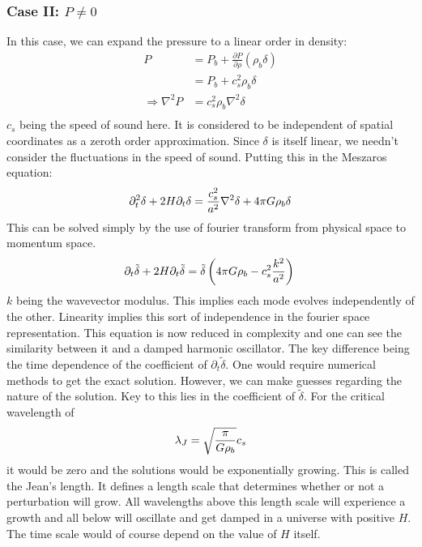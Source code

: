 \documentclass[12pt,a4paper,twoside]{book}
\def\pa{{\partial}}
\begin{document}
			\subsubsection{Case II: $P\neq0$}
				In this case, we can expand the pressure to a linear order in density:
				$$
				\begin{aligned}
					P&=P_b+\frac{\pa P}{\pa \rho}(\rho_b\delta)\\
					&=P_b+c_s^2\rho_b\delta\\
					\Rightarrow\nabla^2P&=c_s^2\rho_b\nabla^2\delta\\
				\end{aligned}
				$$
				$c_s$ being the speed of sound here. It is considered to be independent of spatial coordinates as a zeroth order approximation. Since $\delta$ is itself linear, we needn't consider the fluctuations in the speed of sound. Putting this in the Meszaros equation:
				$$
					\pa_t^2\delta+2H\pa_t\delta=\frac{c_s^2}{a^2}\nabla^2\delta+4\pi G\rho_b\delta\\
				$$
				This can be solved simply by the use of fourier transform from physical space to momentum space.
				$$
					\pa_t\tilde{\delta}+2H\pa_t\tilde{\delta}=\tilde{\delta}\left(4\pi G\rho_b-c_s^2\frac{k^2}{a^2}\right)\\
				$$
				$k$ being the wavevector modulus. This implies each mode evolves independently of the other. Linearity implies this sort of independence in the fourier space representation. This equation is now reduced in complexity and one can see the similarity between it and a damped harmonic oscillator. The key difference being the time dependence of the coefficient of $\pa_t\tilde{\delta}$. One would require numerical methods to get the exact solution. However, we can make guesses regarding the nature of the solution. Key to this lies in the coefficient of $\tilde{\delta}$. For the critical wavelength of
				\begin{equation}
					\lambda_J=\sqrt{\frac{\pi}{G\rho_b}}c_s\\
					\label{ew:JeansLength}
				\end{equation}
				it would be zero and the solutions would be exponentially growing. This is called the Jean's length. It defines a length scale that determines whether or not a perturbation will grow. All wavelengths above this length scale will experience a growth and all below will oscillate and get damped in a universe with positive $H$. The time scale would of course depend on the value of $H$ itself.
\end{document}
